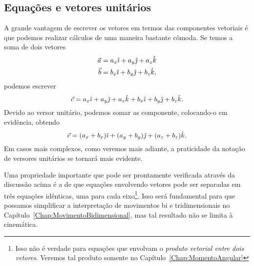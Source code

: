 \subsection{Equações e vetores unitários}

A grande vantagem de escrever os vetores em termos das componentes vetoriais é que podemos realizar cálculos de uma maneira bastante cômoda. Se temos a soma de dois vetores 
\begin{align}
  \vec{a} &= a_x \hat{\imath} + a_y \hat{\jmath} + a_z \hat{k} \\
  \vec{b} &= b_x \hat{\imath} + b_y \hat{\jmath} + b_z \hat{k},
\end{align}
%
podemos escrever
\begin{equation}
  \vec{c} = a_x \hat{\imath} + a_y \hat{\jmath} + a_z \hat{k} + b_x \hat{\imath} + b_y \hat{\jmath} + b_z \hat{k}.
\end{equation}
%
Devido ao versor unitário, podemos somar as componente, colocando-o em evidência, obtendo
\begin{equation}
  \vec{c} = (a_x + b_x) \hat{\imath} + (a_y + b_y) \hat{\jmath} + (a_z + b_z)\hat{k}.
\end{equation}
%
Em casos mais complexos, como veremos mais adiante, a praticidade da notação de versores unitários se tornará mais evidente.

Uma propriedade importante que pode ser prontamente verificada através da discussão acima é a de que equações envolvendo vetores pode ser separadas em três equações idênticas, uma para cada eixo\footnote{Isso não é verdade para equações que envolvam o \emph{produto vetorial entre dois vetores}. Veremos tal produto somente no Capítulo~\ref{Chap:MomentoAngular}}. Isso será fundamental para que possamos simplificar a interpretação de movimentos bi e tridimensionais no Capítulo~\ref{Chap:MovimentoBidimensional}, mas tal resultado não se limita à cinemática.


